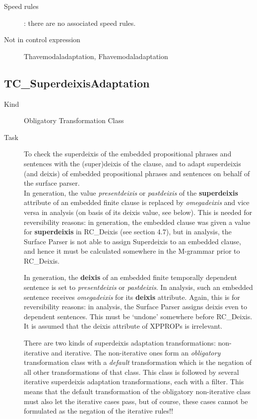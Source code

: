 \begin{description}
\item[Speed rules]: there are no associated speed rules.
\item[Not in control expression] Thavemodaladaptation, Fhavemodaladaptation
\end{description}

\newpage
\subsection{TC\_SuperdeixisAdaptation}
\begin{description}
\item[Kind] Obligatory Transformation Class
\item[Task] 
To check the superdeixis of the embedded 
propositional phrases and sentences with the (super)deixis 
of the clause, and to adapt superdeixis (and deixis)
of embedded propositional phrases 
and sentences on behalf of the surface parser.\\
In generation, the value {\em presentdeixis\/} or {\em pastdeixis\/} of 
the {\bf superdeixis} 
attribute of an embedded finite clause is replaced by {\em omegadeixis\/} 
and vice versa in analysis (on basis of its deixis value, see below).
This is needed for reversibility reasons: in generation, the embedded clause 
was given a value for {\bf superdeixis} in RC\_Deixis (see section 4.7), but 
in analysis, the Surface 
Parser is not able to assign Superdeixis to an embedded clause, and hence it 
must be calculated somewhere in the M-grammar prior to RC\_Deixis.

In generation, the {\bf deixis} of an embedded finite temporally dependent 
sentence is set to 
{\em presentdeixis\/} or {\em pastdeixis\/}.
In analysis, such an embedded sentence receives {\em omegadeixis\/} for 
its {\bf deixis} attribute. Again, this is for reversibility 
reasons: in analysis, the Surface Parser assigns deixis even to dependent 
sentences. This must be `undone' somewhere before RC\_Deixis.
 It is assumed that 
the deixis attribute of XPPROPs is irrelevant. 

There are two kinds of superdeixis adaptation transformations: non-iterative 
and iterative. The non-iterative ones
form an {\em obligatory} transformation class 
with a {\em default} transformation which is the negation of all other 
transformations of that class. This class is followed by several 
iterative superdeixis adaptation transformations, each with a filter.
This means that the default transformation of the obligatory non-iterative 
class must also let the iterative cases pass, but of course, these cases cannot 
be formulated as the negation of the iterative rules!!


\end{description}
